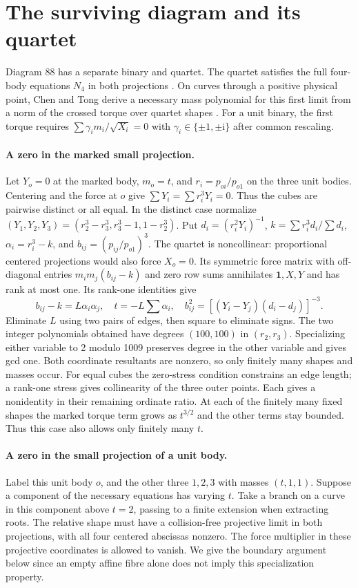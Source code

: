 \documentclass[11pt]{article}
\begin{document}
\section{The surviving diagram and its quartet}
Diagram 88 has a separate binary and quartet. The quartet satisfies the full four-body equations $N_4$ in both projections \cite[Lemma 6.16(a)]{Tomar}. On curves through a positive physical point, Chen and Tong derive a necessary mass polynomial for this first limit from a norm of the crossed torque over quartet shapes \cite[Prop.~5.14]{CT}. For a unit binary, the first torque requires $\sum \gamma_i m_i/\sqrt{X_i}=0$ with $\gamma_i\in\{\pm1,\pm\mathrm i\}$ after common rescaling.

\paragraph{A zero in the marked small projection.}
Let $Y_o=0$ at the marked body, $m_o=t$, and $r_i=p_{oi}/p_{o1}$ on the three unit bodies. Centering and the force at $o$ give $\sum Y_i=\sum r_i^3Y_i=0$. Thus the cubes are pairwise distinct or all equal. In the distinct case normalize $(Y_1,Y_2,Y_3)=(r_2^3-r_3^3,r_3^3-1,1-r_2^3)$. Put $d_i=(r_i^2Y_i)^{-1}$, $k=\sum r_i^3 d_i/\sum d_i$, $\alpha_i=r_i^3-k$, and $b_{ij}=(p_{ij}/p_{o1})^3$. The quartet is noncollinear: proportional centered projections would also force $X_o=0$. Its symmetric force matrix with off-diagonal entries $m_im_j(b_{ij}-k)$ and zero row sums annihilates $\mathbf1,X,Y$ and has rank at most one. Its rank-one identities give
\[
 b_{ij}-k=L\alpha_i\alpha_j,\quad t=-L\sum\alpha_i,\quad
 b_{ij}^2=[(Y_i-Y_j)(d_i-d_j)]^{-3}.
\]
Eliminate $L$ using two pairs of edges, then square to eliminate signs. The two integer polynomials obtained have degrees $(100,100)$ in $(r_2,r_3)$. Specializing either variable to 2 modulo 1009 preserves degree in the other variable and gives gcd one. Both coordinate resultants are nonzero, so only finitely many shapes and masses occur. For equal cubes the zero-stress condition constrains an edge length; a rank-one stress gives collinearity of the three outer points. Each gives a nonidentity in their remaining ordinate ratio. At each of the finitely many fixed shapes the marked torque term grows as $t^{3/2}$ and the other terms stay bounded. Thus this case also allows only finitely many $t$.

\paragraph{A zero in the small projection of a unit body.}
Label this unit body $o$, and the other three $1,2,3$ with masses $(t,1,1)$. Suppose a component of the necessary equations has varying $t$. Take a branch on a curve in this component above $t=2$, passing to a finite extension when extracting roots. The relative shape must have a collision-free projective limit in both projections, with all four centered abscissas nonzero. The force multiplier in these projective coordinates is allowed to vanish. We give the boundary argument below since an empty affine fibre alone does not imply this specialization property.
\end{document}
